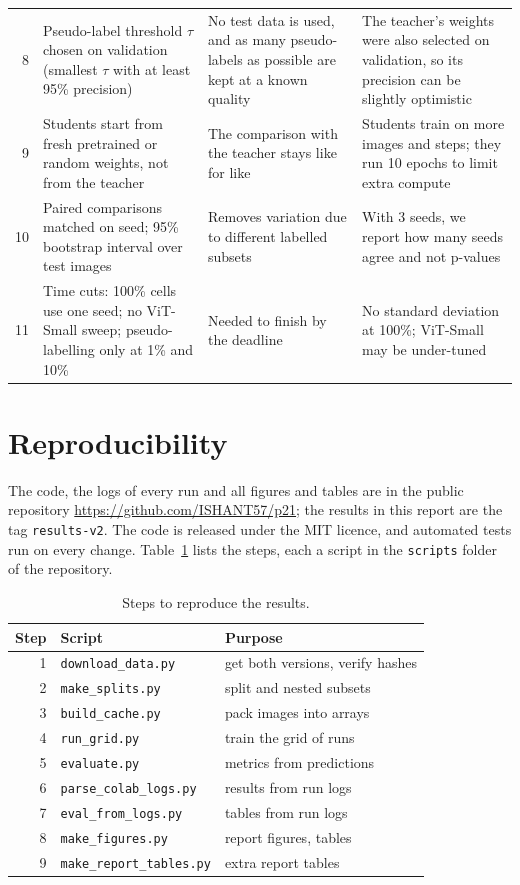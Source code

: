 \documentclass[conference]{IEEEtran}
\begin{document}
\begin{table}[t]
\begin{tabular}{r p{4.6cm} p{5.2cm} p{5.6cm}}
8 & Pseudo-label threshold $\tau$ chosen on validation (smallest $\tau$ with at least 95\% precision) & No test data is used, and as many pseudo-labels as possible are kept at a known quality & The teacher's weights were also selected on validation, so its precision can be slightly optimistic \\
9 & Students start from fresh pretrained or random weights, not from the teacher & The comparison with the teacher stays like for like & Students train on more images and steps; they run 10 epochs to limit extra compute \\
10 & Paired comparisons matched on seed; 95\% bootstrap interval over test images & Removes variation due to different labelled subsets & With 3 seeds, we report how many seeds agree and not p-values \\
11 & Time cuts: 100\% cells use one seed; no ViT-Small sweep; pseudo-labelling only at 1\% and 10\% & Needed to finish by the deadline & No standard deviation at 100\%; ViT-Small may be under-tuned \\
\bottomrule
\end{tabular}
\end{table}

\section{Reproducibility}\label{app:repro}
The code, the logs of every run and all figures and tables are in the public repository \url{https://github.com/ISHANT57/p21}; the results in this report are the tag \texttt{results-v2}. The code is released under the MIT licence, and automated tests run on every change. Table~\ref{tab:repro} lists the steps, each a script in the \texttt{scripts} folder of the repository.

\begin{table}[t]
\centering
\caption{Steps to reproduce the results.}
\label{tab:repro}
\small
\begin{tabular}{rll}
\toprule
Step & Script & Purpose \\
\midrule
1 & \texttt{download\_data.py} & get both versions, verify hashes \\
2 & \texttt{make\_splits.py} & split and nested subsets \\
3 & \texttt{build\_cache.py} & pack images into arrays \\
4 & \texttt{run\_grid.py} & train the grid of runs \\
5 & \texttt{evaluate.py} & metrics from predictions \\
6 & \texttt{parse\_colab\_logs.py} & results from run logs \\
7 & \texttt{eval\_from\_logs.py} & tables from run logs \\
8 & \texttt{make\_figures.py} & report figures, tables \\
9 & \texttt{make\_report\_tables.py} & extra report tables \\
\bottomrule
\end{tabular}
\end{table}
\end{document}
